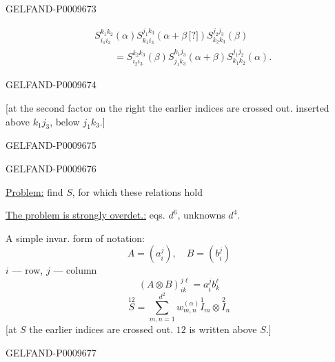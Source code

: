 \begin{GelfandAdjacentEvidence}{GELFAND-P000967}{3}

\begin{equation*}
\begin{aligned}
&S_{i_1i_2}^{k_1k_2}(\alpha)
 S_{k_1i_3}^{j_1k_3}(\alpha+\beta\,\text{[?]})
 S_{k_2k_3}^{j_2j_3}(\beta)\\
&\qquad=S_{i_2i_3}^{k_2k_3}(\beta)
 S_{j_1k_3}^{k_1j_3}(\alpha+\beta)
 S_{k_1k_2}^{j_1j_2}(\alpha).
\end{aligned}\tag{12}
\end{equation*}
\end{GelfandAdjacentEvidence}
\begin{GelfandAdjacentEvidence}{GELFAND-P000967}{4}


[at the second factor on the right the earlier indices are crossed out. inserted above $k_1j_3$, below $j_1k_3$.]
\end{GelfandAdjacentEvidence}
\begin{GelfandAdjacentEvidence}{GELFAND-P000967}{5}

\end{GelfandAdjacentEvidence}
\begin{GelfandAdjacentEvidence}{GELFAND-P000967}{6}


\underline{Problem:} find $S$, for which these relations hold

\underline{The problem is strongly overdet.:} eqs. $d^6$, unknowns $d^4$.

A simple invar. form of notation:
\begin{equation*}
 A=(a_i^j),\quad B=(b_i^j)\tag{13}
\end{equation*}
$i$ --- row, $j$ --- column
\begin{equation*}
 (A\otimes B)_{ik}^{j\ell}=a_i^j b_k^\ell\tag{14}
\end{equation*}
\begin{equation*}
 \overset{12}{S}=\sum_{m,n=1}^{d^2}w_{m,n}^{(\alpha)}
   \overset{1}{I}_m\otimes\overset{2}{I}_n\tag{15}
\end{equation*}
[at $S$ the earlier indices are crossed out. $12$ is written above $S$.]
\end{GelfandAdjacentEvidence}
\begin{GelfandAdjacentEvidence}{GELFAND-P000967}{7}

\end{GelfandAdjacentEvidence}


